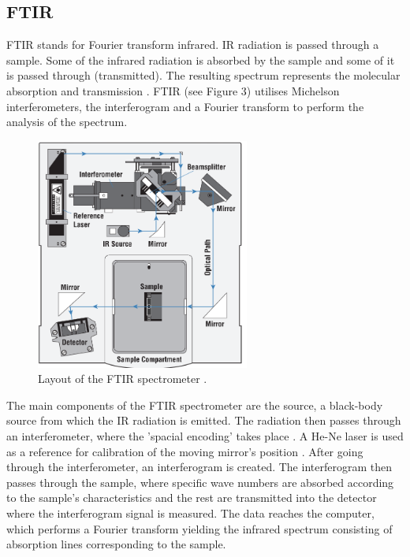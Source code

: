 \documentclass[reprint,amsmath,amssymb,aps, prl]{revtex4-2}
\begin{document}
\subsection{FTIR}
FTIR stands for Fourier transform infrared. IR radiation is passed through a sample.
Some of the infrared radiation is absorbed by the sample and some of it is
passed through (transmitted). The resulting spectrum represents the molecular
absorption and transmission \cite{FTIRmanual}. FTIR (see Figure 3) utilises Michelson interferometers, the interferogram and a Fourier transform to perform the analysis of the spectrum. 
\begin{figure}[h]
    \includegraphics[width=7cm]{Images/FTIR LAYOUT.png}
    \caption{Layout of the FTIR spectrometer \cite{FTIRmanual}.}
    \label{fig:FTIR}
    \centering
\end{figure}

The main components of the FTIR spectrometer are the source, a black-body source from which the IR radiation is emitted. The radiation then passes through an interferometer, where the 'spacial encoding' takes place \cite{FTIRmanual}. A He-Ne laser is used as a reference for calibration of the moving mirror's position \cite{stuart}. After going through the interferometer, an interferogram is created. The interferogram then passes through the sample, where specific wave numbers are absorbed according to the sample's characteristics and the rest are transmitted into the detector where the interferogram signal is measured. The data reaches the computer, which performs a Fourier transform yielding the infrared spectrum consisting of absorption lines corresponding to the sample. 
\end{document}

